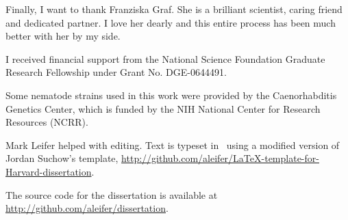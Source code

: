Finally, I want to thank Franziska Graf. She is a brilliant scientist, caring friend and dedicated partner. I love her dearly and this entire process has been much better with her by my side.



I received financial support from the National Science Foundation 
Graduate Research Fellowship under Grant No. DGE-0644491.

Some nematode strains used in this work were provided by the Caenorhabditis Genetics Center, which is funded by the NIH National Center for Research Resources (NCRR).

Mark Leifer helped with editing. Text is typeset in \XeTeX ~using a modified version of Jordan Suchow's template, \url{http://github.com/aleifer/LaTeX-template-for-Harvard-dissertation}.

The source code for the dissertation is available at \url{http://github.com/aleifer/dissertation}.



